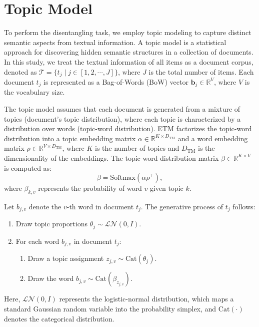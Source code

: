 \section{Topic Model}

To perform the disentangling task, we employ topic modeling to capture distinct semantic aspects from textual information. A topic model is a statistical approach for discovering hidden semantic structures in a collection of documents. In this study, we treat the textual information of all items as a document corpus, denoted as $\mathcal{T} = \{t_j \mid j \in [1, 2, \cdots, J]\}$, where $J$ is the total number of items. Each document $t_j$ is represented as a Bag-of-Words (BoW) vector $\mathbf{b}_j \in \mathbb{R}^{V}$, where $V$ is the vocabulary size.

The topic model assumes that each document is generated from a mixture of topics (document’s topic distribution), where each topic is characterized by a distribution over words (topic-word distribution). ETM factorizes the topic-word distribution into a topic embedding matrix $\alpha \in \mathbb{R}^{K \times D_{\text{TM}}}$ and a word embedding matrix $\rho \in \mathbb{R}^{V \times D_{\text{TM}}}$, where $K$ is the number of topics and $D_{\text{TM}}$ is the dimensionality of the embeddings. The topic-word distribution matrix $\beta \in \mathbb{R}^{K \times V}$ is computed as:
\[
\beta = \text{Softmax}(\alpha \rho^\top),
\]
where $\beta_{k,v}$ represents the probability of word $v$ given topic $k$.

Let $b_{j,v}$ denote the $v$-th word in document $t_j$. The generative process of $t_j$ follows:
\begin{enumerate}
    \item Draw topic proportions $\theta_j \sim \mathcal{LN}(0, I)$.
    \item For each word $b_{j,v}$ in document $t_j$:
    \begin{enumerate}
        \item Draw a topic assignment $z_{j,v} \sim \text{Cat}(\theta_j)$.
        \item Draw the word $b_{j,v} \sim \text{Cat}(\beta_{z_{j,v}})$.
    \end{enumerate}
\end{enumerate}

Here, $\mathcal{LN}(0, I)$ represents the logistic-normal distribution, which maps a standard Gaussian random variable into the probability simplex, and $\text{Cat}(\cdot)$ denotes the categorical distribution.
